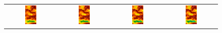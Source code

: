 \begin{figure}[htb]
\begin {tabular}{@{}cccc@{}}
 \includegraphics[width=0.23\textwidth]{figures/VisitScreenshots/SPE1000/SPE1000_PERM_t09.png} &
 \includegraphics[width=0.23\textwidth]{figures/VisitScreenshots/SPE1000/SPE1000_PERM_t10.png} &
 \includegraphics[width=0.23\textwidth]{figures/VisitScreenshots/SPE1000/SPE1000_PERM_t11.png} &
 \includegraphics[width=0.23\textwidth]{figures/VisitScreenshots/SPE1000/SPE1000_PERM_t12.png} \\

\end{tabular}
\end{figure}
